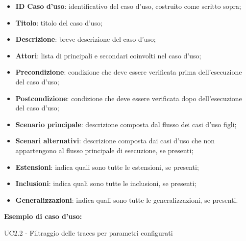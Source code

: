                 \begin{itemize}
                    \item\textbf{ID Caso d'uso}: identificativo del caso d'uso, costruito come scritto sopra;
                    \item\textbf{Titolo}: titolo del caso d'uso;
                    \item\textbf{Descrizione}: breve descrizione del caso d'uso;
                    \item\textbf{Attori}: lista di  principali e secondari coinvolti nel caso d'uso;
                    \item\textbf{Precondizione}: condizione che deve essere verificata prima dell'esecuzione del caso d'uso;
                    \item\textbf{Postcondizione}: condizione che deve essere verificata dopo dell'esecuzione del caso d'uso;
                    \item\textbf{Scenario principale}: descrizione composta dal flusso dei casi d'uso figli;
                    \item\textbf{Scenari alternativi}: descrizione composta dai casi d'uso che non appartengono al flusso
                    principale di esecuzione, se presenti;
                    \item\textbf{Estensioni}: indica quali sono tutte le estensioni, se presenti;
                    \item\textbf{Inclusioni}: indica quali sono tutte le inclusioni, se presenti;
                    \item\textbf{Generalizzazioni}: indica quali sono tutte le generalizzazioni, se presenti.
                \end{itemize}

\newpage

            \textbf{Esempio di caso d'uso:}

            UC2.2 - Filtraggio delle traces per parametri configurati

